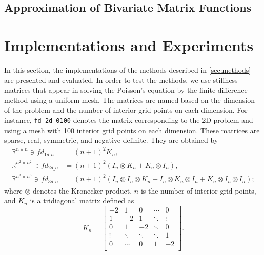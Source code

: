 \subsection{Approximation of Bivariate Matrix Functions}\label{sec:krylovmethodbivariate}

\section{Implementations and Experiments}
In this section, the implementations of the methods described in \autoref{sec:methods} are presented and evaluated.
In order to test the methods, we use stiffness matrices that appear in solving the Poisson's equation by the finite
difference method using a uniform mesh. The matrices are named based on the dimension of the problem and the number
of interior grid points on each dimension. For instance, \texttt{fd\_2d\_0100} denotes the matrix corresponding to
the 2D problem and using a mesh with 100 interior grid points on each dimension. These matrices are sparse, real,
symmetric, and negative definite. They are obtained by
\begin{equation*}
    \begin{aligned}
        \mathbb{R}^{n \times n} \ni fd_{1d\_n} & = (n+1)^2 K_n,\\
        \mathbb{R}^{n^2 \times n^2} \ni fd_{2d\_n} & = (n+1)^2  (I_n \otimes K_n + K_n \otimes I_n),\\
        \mathbb{R}^{n^3 \times n^3} \ni fd_{3d\_n} & = (n+1)^2  (
            I_n \otimes I_n \otimes K_n + I_n \otimes K_n \otimes I_n+ K_n \otimes I_n \otimes I_n);
        \end{aligned}
\end{equation*}
where $\otimes$ denotes the Kronecker product, $n$ is the number of interior grid points, and $K_n$ is a tridiagonal
matrix defined as
\begin{equation*}
    K_n =
    \begin{bmatrix}
        -2 & 1 & 0 & \cdots & 0 \\
        1 & -2 & 1 & \ddots & \vdots \\
        0 & 1 & -2 & \ddots & 0 \\
        \vdots & \ddots & \ddots & \ddots & 1 \\
        0 & \cdots & 0 & 1 & -2  \\
    \end{bmatrix}.
\end{equation*}

